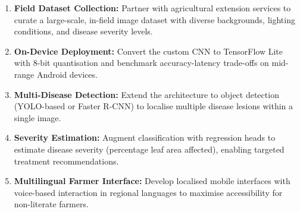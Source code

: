 \documentclass[11pt,a4paper]{article}
\begin{document}
\begin{enumerate}[label=\textcolor{accent}{\textbullet}, leftmargin=2em, itemsep=3pt]
  \item \textbf{Field Dataset Collection:} Partner with agricultural
        extension services to curate a large-scale, in-field image dataset
        with diverse backgrounds, lighting conditions, and disease severity
        levels.
  \item \textbf{On-Device Deployment:} Convert the custom CNN to TensorFlow
        Lite with 8-bit quantisation and benchmark accuracy-latency trade-offs
        on mid-range Android devices.
  \item \textbf{Multi-Disease Detection:} Extend the architecture to object
        detection (YOLO-based or Faster R-CNN) to localise multiple disease
        lesions within a single image.
  \item \textbf{Severity Estimation:} Augment classification with regression
        heads to estimate disease severity (percentage leaf area affected),
        enabling targeted treatment recommendations.
  \item \textbf{Multilingual Farmer Interface:} Develop localised mobile
        interfaces with voice-based interaction in regional languages to
        maximise accessibility for non-literate farmers.
\end{enumerate}
\end{document}
